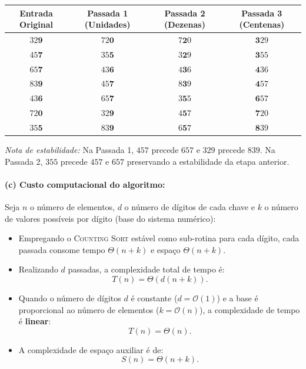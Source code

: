 \documentclass[11pt,a4paper]{article}
\begin{document}
\begin{center}
\begin{tabular}{cccc}
\toprule
\textbf{Entrada Original} & \textbf{Passada 1 (Unidades)} & \textbf{Passada 2 (Dezenas)} & \textbf{Passada 3 (Centenas)} \\
\midrule
$32\mathbf{9}$ & $72\mathbf{0}$ & $7\mathbf{2}0$ & $\mathbf{3}29$ \\
$45\mathbf{7}$ & $35\mathbf{5}$ & $3\mathbf{2}9$ & $\mathbf{3}55$ \\
$65\mathbf{7}$ & $43\mathbf{6}$ & $4\mathbf{3}6$ & $\mathbf{4}36$ \\
$83\mathbf{9}$ & $45\mathbf{7}$ & $8\mathbf{3}9$ & $\mathbf{4}57$ \\
$43\mathbf{6}$ & $65\mathbf{7}$ & $3\mathbf{5}5$ & $\mathbf{6}57$ \\
$72\mathbf{0}$ & $32\mathbf{9}$ & $4\mathbf{5}7$ & $\mathbf{7}20$ \\
$35\mathbf{5}$ & $83\mathbf{9}$ & $6\mathbf{5}7$ & $\mathbf{8}39$ \\
\bottomrule
\end{tabular}
\end{center}

\textit{Nota de estabilidade:} Na Passada 1, $457$ precede $657$ e $329$ precede $839$. Na Passada 2, $355$ precede $457$ e $657$ preservando a estabilidade da etapa anterior.

\paragraph{(c) Custo computacional do algoritmo:}
Seja $n$ o número de elementos, $d$ o número de dígitos de cada chave e $k$ o número de valores possíveis por dígito (base do sistema numérico):
\begin{itemize}
    \item Empregando o \textsc{Counting Sort} estável como sub-rotina para cada dígito, cada passada consome tempo $\Theta(n + k)$ e espaço $\Theta(n + k)$.
    \item Realizando $d$ passadas, a complexidade total de tempo é:
    \begin{equation}
        T(n) = \Theta(d(n + k)).
    \end{equation}
    \item Quando o número de dígitos $d$ é constante ($d = \mathcal{O}(1)$) e a base é proporcional ao número de elementos ($k = \mathcal{O}(n)$), a complexidade de tempo é \textbf{linear}:
    \begin{equation}
        T(n) = \Theta(n).
    \end{equation}
    \item A complexidade de espaço auxiliar é de:
    \begin{equation}
        S(n) = \Theta(n + k).
    \end{equation}
\end{itemize}
\end{document}
